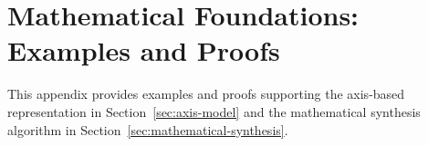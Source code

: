 \section{Mathematical Foundations: Examples and Proofs}
\label{app:foundations}
This appendix provides examples and proofs supporting the axis-based
representation in Section~\ref{sec:axis-model} and the mathematical
synthesis algorithm in Section~\ref{sec:mathematical-synthesis}.


\FloatBarrier


\FloatBarrier

\FloatBarrier

\FloatBarrier

\FloatBarrier
